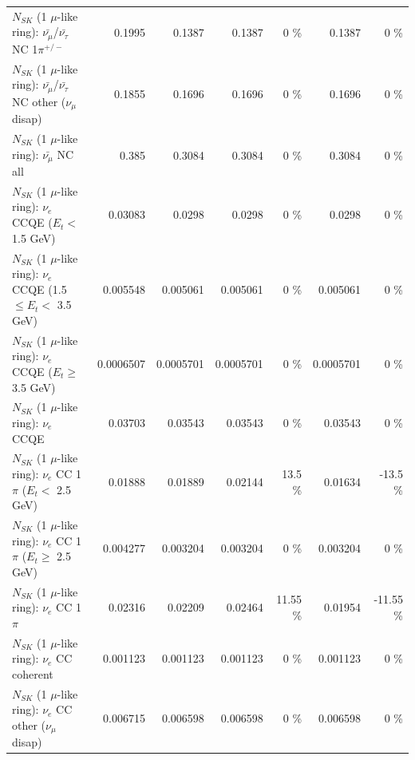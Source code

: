 \begin{table}
\begin{tabular}{| l | r | r | r  r | r  r |}
\hline
  $N_{SK}$ (1 $\mu$-like ring): $\bar{\nu_\mu}$/$\bar{\nu_\tau}$ NC 1$\pi^{+/-}$ &          0.1995 &          0.1387 &          0.1387 &        0 \%  &          0.1387 &        0 \%  \\ 
$N_{SK}$ (1 $\mu$-like ring): $\bar{\nu_\mu}$/$\bar{\nu_\tau}$ NC other ($\nu_\mu$ disap) &          0.1855 &          0.1696 &          0.1696 &        0 \%  &          0.1696 &        0 \%  \\ 
                          $N_{SK}$ (1 $\mu$-like ring): $\bar{\nu_{\mu}}$ NC all &           0.385 &          0.3084 &          0.3084 &        0 \%  &          0.3084 &        0 \%  \\ 
\hline
\hline
\hline
                  $N_{SK}$ (1 $\mu$-like ring): $\nu_e$ CCQE ($E_{t} <$ 1.5 GeV) &         0.03083 &          0.0298 &          0.0298 &        0 \%  &          0.0298 &        0 \%  \\ 
         $N_{SK}$ (1 $\mu$-like ring): $\nu_e$ CCQE (1.5 $\leq E_{t} <$ 3.5 GeV) &        0.005548 &        0.005061 &        0.005061 &        0 \%  &        0.005061 &        0 \%  \\ 
               $N_{SK}$ (1 $\mu$-like ring): $\nu_e$ CCQE ($E_{t} \geq$ 3.5 GeV) &       0.0006507 &       0.0005701 &       0.0005701 &        0 \%  &       0.0005701 &        0 \%  \\ 
\hline
                                      $N_{SK}$ (1 $\mu$-like ring): $\nu_e$ CCQE &         0.03703 &         0.03543 &         0.03543 &        0 \%  &         0.03543 &        0 \%  \\ 
\hline
             $N_{SK}$ (1 $\mu$-like ring): $\nu_e$ CC 1$\pi$ ($E_{t} <$ 2.5 GeV) &         0.01888 &         0.01889 &         0.02144 &     13.5 \%  &         0.01634 &    -13.5 \%  \\ 
          $N_{SK}$ (1 $\mu$-like ring): $\nu_e$ CC 1$\pi$ ($E_{t} \geq$ 2.5 GeV) &        0.004277 &        0.003204 &        0.003204 &        0 \%  &        0.003204 &        0 \%  \\ 
\hline
                                 $N_{SK}$ (1 $\mu$-like ring): $\nu_e$ CC 1$\pi$ &         0.02316 &         0.02209 &         0.02464 &    11.55 \%  &         0.01954 &   -11.55 \%  \\ 
                               $N_{SK}$ (1 $\mu$-like ring): $\nu_e$ CC coherent &        0.001123 &        0.001123 &        0.001123 &        0 \%  &        0.001123 &        0 \%  \\ 
                $N_{SK}$ (1 $\mu$-like ring): $\nu_e$ CC other ($\nu_\mu$ disap) &        0.006715 &        0.006598 &        0.006598 &        0 \%  &        0.006598 &        0 \%  \\ 

\end{tabular}
\end{table}
